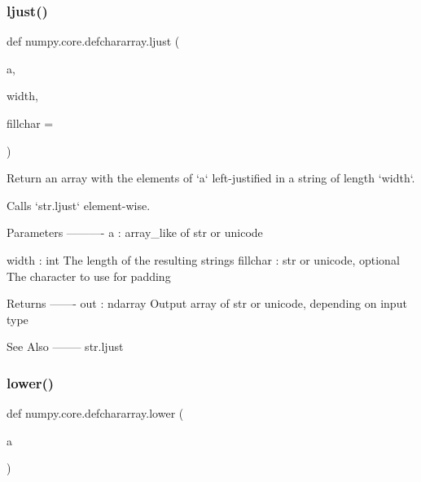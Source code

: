 \subsubsection{\texorpdfstring{ljust()}{ljust()}}
{\footnotesize\ttfamily def numpy.\+core.\+defchararray.\+ljust (\begin{DoxyParamCaption}\item[{}]{a,  }\item[{}]{width,  }\item[{}]{fillchar = {\ttfamily \textquotesingle{}~\textquotesingle{}} }\end{DoxyParamCaption})}

\begin{DoxyVerb}Return an array with the elements of `a` left-justified in a
string of length `width`.

Calls `str.ljust` element-wise.

Parameters
----------
a : array_like of str or unicode

width : int
    The length of the resulting strings
fillchar : str or unicode, optional
    The character to use for padding

Returns
-------
out : ndarray
    Output array of str or unicode, depending on input type

See Also
--------
str.ljust\end{DoxyVerb}
 \mbox{\label{namespacenumpy_1_1core_1_1defchararray_a00f236ce1422db553905a918a30625c6}} 
\subsubsection{\texorpdfstring{lower()}{lower()}}
{\footnotesize\ttfamily def numpy.\+core.\+defchararray.\+lower (\begin{DoxyParamCaption}\item[{}]{a }\end{DoxyParamCaption})}

